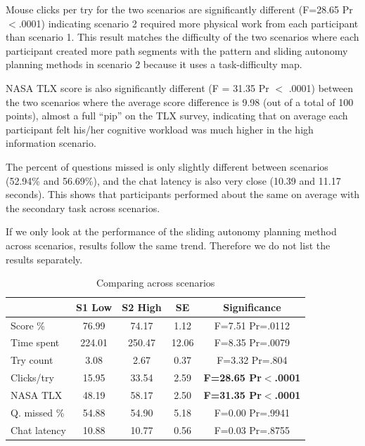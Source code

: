 \documentclass[journal]{IEEEtran}
\begin{document}
Mouse clicks per try for the two scenarios are significantly different (F=28.65 Pr$<$.0001) indicating scenario 2 required more physical work from each participant than scenario 1. This result matches the difficulty of the two scenarios where each participant created more path segments with the pattern and sliding autonomy planning methods in scenario 2 because it uses a task-difficulty map.

NASA TLX score is also significantly different (F = 31.35 Pr $<$ .0001) between the two scenarios where the average score difference is 9.98 (out of a total of 100 points), almost a full ``pip'' on the TLX survey, indicating that on average each participant felt his/her cognitive workload was much higher in the high information scenario.

The percent of questions missed is only slightly different between scenarios (52.94\% and 56.69\%), and the chat latency is also very close (10.39 and 11.17 seconds). This shows that participants performed about the same on average with the secondary task across scenarios.

If we only look at the performance of the sliding autonomy planning method across scenarios, results follow the same trend. Therefore we do not list the results separately.

\begin{table}
\caption{Comparing across scenarios}
\scriptsize
	\centering
		\begin{tabular}
			{|l|c|c|c|c|}
			\hline
			& S1 Low & S2 High & SE & Significance \\
			\hline
			Score \% & 76.99 & 74.17 & 1.12 & F=7.51 Pr=.0112 \\
			Time spent & 224.01 & 250.47 & 12.06 & F=8.35 Pr=.0079 \\
			Try count & 3.08 & 2.67 & 0.37 & F=3.32 Pr=.804 \\
			Clicks/try	& 15.95 & 33.54 & 2.59 & \textbf{F=28.65 Pr$<$.0001} \\ 
			NASA TLX & 48.19 & 58.17 & 2.50 & \textbf{F=31.35 Pr$<$.0001} \\ 
			\hline
			Q. missed \% & 54.88 & 54.90 & 5.18 & F=0.00 Pr=.9941 \\ 
			Chat latency & 10.88 & 10.77 & 0.56 & F=0.03 Pr=.8755 \\ 
			\hline			
		\end{tabular}
\label{AcrossScenarios}
\end{table}
\end{document}
